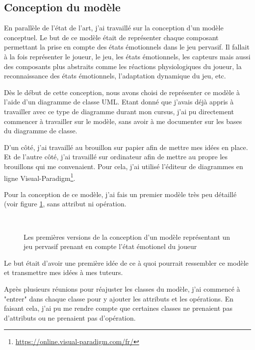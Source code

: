 \documentclass{article}
\begin{document}
	\subsection{Conception du modèle}
		En parallèle de l'état de l'art, j'ai travaillé sur la conception d'un modèle conceptuel. 
		Le but de ce modèle était de représenter chaque composant permettant la prise en compte des états émotionnels dans le jeu pervasif. 
		Il fallait à la fois représenter le joueur, le jeu, les états émotionnels, les capteurs mais aussi des composants plus abstraits comme les réactions physiologiques du joueur, la reconnaissance des états émotionnels, l'adaptation dynamique du jeu, etc.\par
		Dès le début de cette conception, nous avons choisi de représenter ce modèle à l'aide d'un diagramme de classe UML. 
		Etant donné que j'avais déjà appris à travailler avec ce type de diagramme durant mon cursus, j'ai pu directement commencer à travailler sur le modèle, sans avoir à me documenter sur les bases du diagramme de classe.\par
		D'un côté, j'ai travaillé au brouillon sur papier afin de mettre mes idées en place.
		Et de l'autre côté, j'ai travaillé sur ordinateur afin de mettre au propre les brouillons qui me convenaient.
		Pour cela, j'ai utilisé l'éditeur de diagrammes en ligne Visual-Paradigm\footnote{\href{https://online.visual-paradigm.com/fr/}{https://online.visual-paradigm.com/fr/}}.\par
		Pour la conception de ce modèle, j'ai fais un premier modèle très peu détaillé (voir figure \ref{fig:premmodele}, sans attribut ni opération.
		\begin{figure}
			\label{fig:vers1}\\
			\label{fig:vers2}
			\caption{Les premières versions de la conception d'un modèle représentant un jeu pervasif prenant en compte l'état émotionel du joueur}
			\label{fig:premmodele}
		\end{figure}
		Le but était d'avoir une première idée de ce à quoi pourrait ressembler ce modèle et transmettre mes idées à mes tuteurs.\par
		Après plusieurs réunions pour réajuster les classes du modèle, j'ai commencé à "entrer" dans chaque classe pour y ajouter les attributs et les opérations. 
		En faisant cela, j'ai pu me rendre compte que certaines classes ne prenaient pas d'attributs ou ne prenaient pas d'opération.
\end{document}
